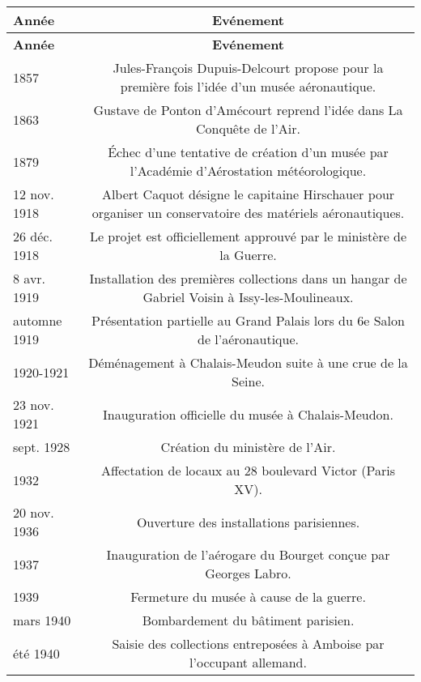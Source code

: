 \renewcommand{\arraystretch}{1.3}  %


\begin{longtable}{B C}
\hline\hline
\textbf{Année} & \textbf{Evénement} \\
\hline
\endfirsthead
	
\hline\hline
\textbf{Année} & \textbf{Evénement} \\
\hline
\endhead
	
\hline
\endfoot
	
\hline\hline
\endlastfoot
	

1857 & Jules-François Dupuis-Delcourt propose pour la première fois l’idée d’un musée aéronautique. \\
1863 & Gustave de Ponton d’Amécourt reprend l’idée dans La Conquête de l’Air. \\
1879 & Échec d'une tentative de création d’un musée par l’Académie d’Aérostation météorologique. \\

12 nov. 1918 & Albert Caquot désigne le capitaine Hirschauer pour organiser un conservatoire des matériels aéronautiques.\\
 26 déc. 1918 & Le projet est officiellement approuvé par le ministère de la Guerre. \\
 8 avr. 1919 & Installation des premières collections dans un hangar de Gabriel Voisin à Issy-les-Moulineaux. \\
 automne 1919 & Présentation partielle au Grand Palais lors du 6e Salon de l’aéronautique. \\
 1920-1921 & Déménagement à Chalais-Meudon suite à une crue de la Seine. \\
 23 nov. 1921 & Inauguration officielle du musée à Chalais-Meudon. \\

sept. 1928 & Création du ministère de l’Air. \\
1932 & Affectation de locaux au 28 boulevard Victor (Paris XV). \\
20 nov. 1936 & Ouverture des installations parisiennes. \\
1937 & Inauguration de l’aérogare du Bourget conçue par Georges Labro. \\
1939 & Fermeture du musée à cause de la guerre. \\
mars 1940 & Bombardement du bâtiment parisien. \\
été 1940 & Saisie des collections entreposées à Amboise par l’occupant  allemand. \\


\end{longtable}
